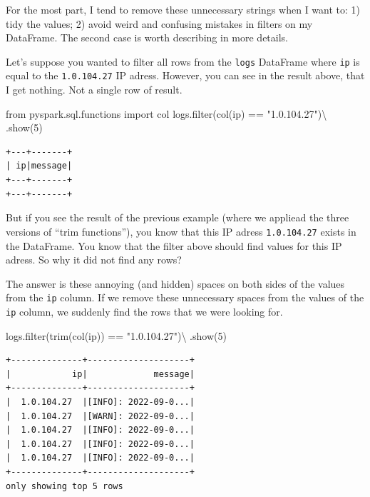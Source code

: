 \documentclass[
  11pt,
  letterpaper,
  DIV=11,
  numbers=noendperiod]{scrreprt}
\newenvironment{Shaded}{\begin{snugshade}}{\end{snugshade}}
\newcommand{\BuiltInTok}[1]{\textcolor[rgb]{0.00,0.23,0.31}{#1}}
\newcommand{\DecValTok}[1]{\textcolor[rgb]{0.68,0.00,0.00}{#1}}
\newcommand{\ImportTok}[1]{\textcolor[rgb]{0.00,0.46,0.62}{#1}}
\newcommand{\NormalTok}[1]{\textcolor[rgb]{0.00,0.23,0.31}{#1}}
\newcommand{\OperatorTok}[1]{\textcolor[rgb]{0.37,0.37,0.37}{#1}}
\newcommand{\StringTok}[1]{\textcolor[rgb]{0.13,0.47,0.30}{#1}}
\begin{document}
For the most part, I tend to remove these unnecessary strings when I
want to: 1) tidy the values; 2) avoid weird and confusing mistakes in
filters on my DataFrame. The second case is worth describing in more
details.

Let's suppose you wanted to filter all rows from the \texttt{logs}
DataFrame where \texttt{ip} is equal to the \texttt{1.0.104.27} IP
adress. However, you can see in the result above, that I get nothing.
Not a single row of result.

\begin{Shaded}
\begin{Highlighting}[]
\ImportTok{from}\NormalTok{ pyspark.sql.functions }\ImportTok{import}\NormalTok{ col}
\NormalTok{logs.}\BuiltInTok{filter}\NormalTok{(col(}\StringTok{\textquotesingle{}ip\textquotesingle{}}\NormalTok{) }\OperatorTok{==} \StringTok{"1.0.104.27"}\NormalTok{)}\OperatorTok{\textbackslash{}}
\NormalTok{    .show(}\DecValTok{5}\NormalTok{)}
\end{Highlighting}
\end{Shaded}

\begin{verbatim}
+---+-------+
| ip|message|
+---+-------+
+---+-------+
\end{verbatim}

But if you see the result of the previous example (where we appliead the
three versions of ``trim functions''), you know that this IP adress
\texttt{1.0.104.27} exists in the DataFrame. You know that the filter
above should find values for this IP adress. So why it did not find any
rows?

The answer is these annoying (and hidden) spaces on both sides of the
values from the \texttt{ip} column. If we remove these unnecessary
spaces from the values of the \texttt{ip} column, we suddenly find the
rows that we were looking for.

\begin{Shaded}
\begin{Highlighting}[]
\NormalTok{logs.}\BuiltInTok{filter}\NormalTok{(trim(col(}\StringTok{\textquotesingle{}ip\textquotesingle{}}\NormalTok{)) }\OperatorTok{==} \StringTok{"1.0.104.27"}\NormalTok{)}\OperatorTok{\textbackslash{}}
\NormalTok{    .show(}\DecValTok{5}\NormalTok{)}
\end{Highlighting}
\end{Shaded}

\begin{verbatim}
+--------------+--------------------+
|            ip|             message|
+--------------+--------------------+
|  1.0.104.27  |[INFO]: 2022-09-0...|
|  1.0.104.27  |[WARN]: 2022-09-0...|
|  1.0.104.27  |[INFO]: 2022-09-0...|
|  1.0.104.27  |[INFO]: 2022-09-0...|
|  1.0.104.27  |[INFO]: 2022-09-0...|
+--------------+--------------------+
only showing top 5 rows
\end{verbatim}
\end{document}
